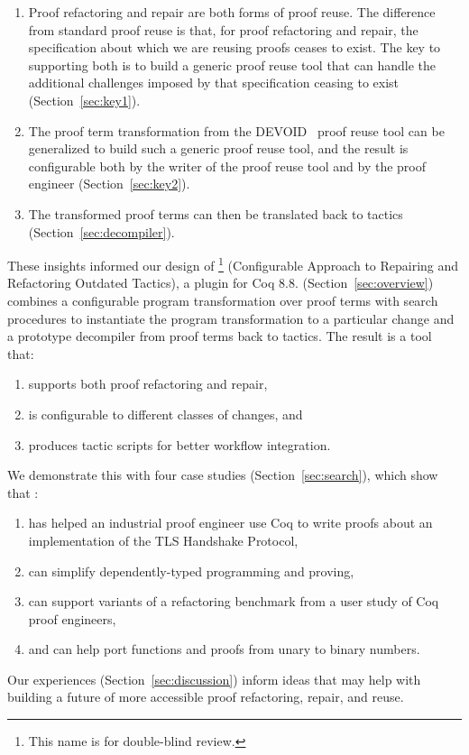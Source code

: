 \begin{enumerate}
\item Proof refactoring and repair are both forms of proof reuse. 
The difference from standard proof reuse is that, for proof refactoring and repair, the specification about which
we are reusing proofs ceases to exist.
The key to supporting both is to build a generic proof reuse
tool that can handle the additional challenges imposed by that specification ceasing to exist (Section~\ref{sec:key1}). 
\item The proof term transformation from the \textsc{DEVOID}~\cite{Ringer2019} proof reuse tool can be generalized
to build such a generic proof reuse tool, and the result is configurable both by the writer of the proof reuse tool and by the 
proof engineer (Section~\ref{sec:key2}).
\item The transformed proof terms can then be translated back to tactics (Section~\ref{sec:decompiler}).
\end{enumerate}

These insights informed our design of 
\toolname\footnote{This name is for double-blind review.} (Configurable Approach to Repairing and Refactoring Outdated Tactics), a plugin for Coq 8.8.
\toolname (Section~\ref{sec:overview}) combines a configurable program transformation over proof terms %
with search procedures to instantiate the program transformation to a particular change
and a prototype decompiler from proof terms back to tactics.
The result is a tool that:

\begin{enumerate}
\item supports both proof refactoring and repair,
\item is configurable to different classes of changes, and
\item produces tactic scripts for better workflow integration.
\end{enumerate}
We demonstrate this with four case studies (Section~\ref{sec:search}), which show that \toolname:

\begin{enumerate}
\item has helped an industrial proof engineer use Coq to write proofs about an implementation
of the TLS Handshake Protocol,
\item can simplify dependently-typed programming and proving,
\item can support variants of a refactoring benchmark from a user study of Coq proof engineers,
\item and can help port functions and proofs from unary to binary numbers.
\end{enumerate}
Our experiences (Section~\ref{sec:discussion}) inform ideas that may help with building a future
of more accessible proof refactoring, repair, and reuse.

